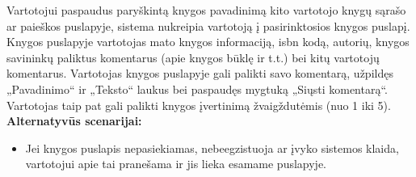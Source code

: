 \documentclass{VUMIFPSkursinis}
\begin{document}
\begin{enumerate}[label=\textbf{U\arabic*.}]
				Vartotojui paspaudus paryškintą knygos pavadinimą kito vartotojo knygų sąrašo ar paieškos puslapyje, sistema nukreipia vartotoją į pasirinktosios knygos puslapį.
				Knygos puslapyje vartotojas mato knygos informaciją, isbn kodą, autorių, knygos savininkų paliktus komentarus (apie knygos būklę ir t.t.) bei kitų vartotojų komentarus.
				Vartotojas knygos puslapyje gali palikti savo komentarą, užpildęs „Pavadinimo“ ir „Teksto“ laukus bei paspaudęs mygtuką „Siųsti komentarą“. Vartotojas taip pat gali palikti knygos įvertinimą žvaigždutėmis (nuo 1 iki 5).\\
				\textbf{Alternatyvūs scenarijai:}
				\begin{itemize}
					\item Jei knygos puslapis nepasiekiamas, nebeegzistuoja ar įvyko sistemos klaida, vartotojui apie tai pranešama ir jis lieka esamame puslapyje.
				\end{itemize}


\end{enumerate}
\end{document}
